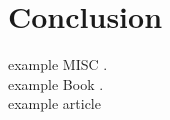 
\section{Conclusion}
example MISC \cite{exampleMISC}.\\
example Book \cite{exampleBOOK}.\\
example article \cite[p.~5]{exampleARTICLE}